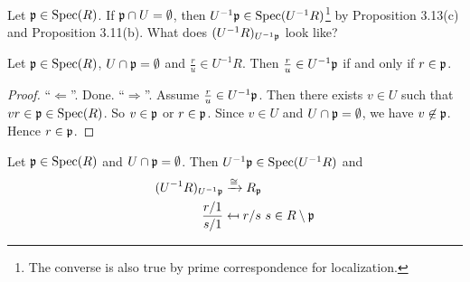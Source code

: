 \begin{question*}
    Let $\mathfrak{p} \in \operatorname{Spec}(R)$. If $\mathfrak{p} \cap U = \emptyset$, then $U^{-1}\mathfrak{p} \in \operatorname{Spec}(U^{-1}R)$\footnote[2]{The converse is also true by prime correspondence for localization.} by Proposition 3.13(c) and Proposition 3.11(b). What does $(U^{-1}R)_{U^{-1}\mathfrak{p}}$ look like?
\end{question*}

\begin{lemma}
    Let $\mathfrak{p} \in \operatorname{Spec}(R)$, $U \cap \mathfrak{p} = \emptyset$ and $\frac{r}{u} \in U^{-1}R$. Then $\frac{r}{u} \in U^{-1}\mathfrak{p}$ if and only if $r \in \mathfrak{p}$. 
\end{lemma}

\begin{proof}
    ``$\Leftarrow$''. Done. ``$\Rightarrow$''. Assume $\frac{r}{u} \in U^{-1}\mathfrak{p}$. Then there exists $v \in U$ such that $vr \in \mathfrak{p} \in \operatorname{Spec}(R)$. So $v \in \mathfrak{p}$ or $r \in \mathfrak{p}$. Since $v \in U$ and $U \cap \mathfrak{p} = \emptyset$, we have $v \not \in \mathfrak{p}$. Hence $r \in \mathfrak{p}$.
\end{proof}

\begin{proposition}
    Let $\mathfrak{p} \in \operatorname{Spec}(R)$ and $U \cap \mathfrak{p} = \emptyset$. Then $U^{-1}\mathfrak{p} \in \operatorname{Spec}(U^{-1}R)$ and 
    \begin{align*}
        (U^{-1}R)_{U^{-1}\mathfrak{p}} &\xrightarrow \cong R_{\mathfrak{p}} \\
        \frac{r/1}{s/1} &\mapsfrom r/s \ s \in R \setminus \mathfrak{p} 
    \end{align*}
\end{proposition}

